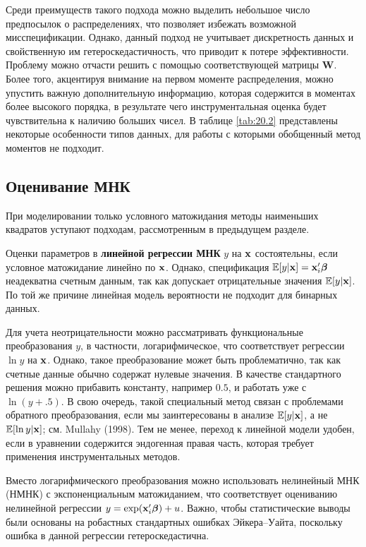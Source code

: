 Среди преимуществ такого подхода можно выделить небольшое число предпосылок о распределениях, что позволяет избежать возможной мисспецификации. Однако, данный подход не учитывает дискретность данных и свойственную им гетероскедастичность, что приводит к потере эффективности. Проблему можно отчасти решить с помощью соответствующей матрицы $\mathbf{W}$. Более того, акцентируя внимание на первом моменте распределения, можно упустить важную дополнительную информацию, которая содержится в моментах более высокого порядка, в результате чего инструментальная оценка будет чувствительна к наличию больших чисел. В таблице \ref{tab:20.2} представлены некоторые особенности типов данных, для работы с которыми обобщенный метод моментов не подходит.


\subsection{Оценивание МНК}\label{sec:20.5.2}

\noindent
При моделировании только условного матожидания методы наименьших квадратов уступают подходам, рассмотренным в предыдущем разделе.

Оценки параметров в \textbf{линейной регрессии МНК} $y$ на $\mathbf{x}$ состоятельны, если условное матожидание линейно по $\mathbf{x}$. Однако, спецификация $\mathbb{E}[y|\mathbf{x}] = \mathbf{x}_i'\bm{\beta}$ неадекватна счетным данным, так как допускает отрицательные значения $\mathbb{E}[y|\mathbf{x}]$. По той же причине линейная модель вероятности не подходит для бинарных данных.

Для учета неотрицательности можно рассматривать функциональные преобразования $y$, в частности, логарифмическое, что соответствует регрессии $\ln y$ на $\mathbf{x}$. Однако, такое преобразование может быть проблематично, так как счетные данные обычно содержат нулевые значения. В качестве стандартного решения можно прибавить константу, например $0.5$, и работать уже с $\ln (y + .5)$. В свою очередь, такой специальный метод связан с проблемами обратного преобразования, если мы заинтересованы в анализе $\mathbb{E}[y|\mathbf{x}]$, а не $\mathbb{E}[\ln y|\mathbf{x}]$; см. Mullahy (1998).
Тем не менее, переход к линейной модели удобен, если в уравнении содержится эндогенная правая часть, которая требует применения инструментальных методов.

Вместо логарифмического преобразования можно использовать нелинейный МНК (НМНК) с экспоненциальным матожиданием, что соответствует оцениванию нелинейной регрессии $y = \exp(\mathbf{x}_i'\bm{\beta}) + u$. Важно, чтобы статистические выводы были основаны на робастных стандартных ошибках Эйкера--Уайта, поскольку ошибка в данной регрессии гетероскедастична.

